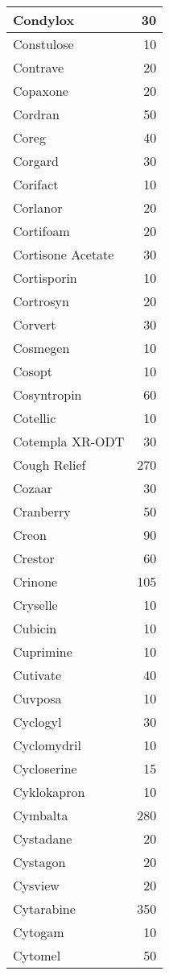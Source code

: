 \documentclass[
]{article}
\begin{document}
\begin{table}
\begin{tabular}[t]{l|r}
\hline
Condylox & 30\\
\hline
Constulose & 10\\
\hline
Contrave & 20\\
\hline
Copaxone & 20\\
\hline
Cordran & 50\\
\hline
Coreg & 40\\
\hline
Corgard & 30\\
\hline
Corifact & 10\\
\hline
Corlanor & 20\\
\hline
Cortifoam & 20\\
\hline
Cortisone Acetate & 30\\
\hline
Cortisporin & 10\\
\hline
Cortrosyn & 20\\
\hline
Corvert & 30\\
\hline
Cosmegen & 10\\
\hline
Cosopt & 10\\
\hline
Cosyntropin & 60\\
\hline
Cotellic & 10\\
\hline
Cotempla XR-ODT & 30\\
\hline
Cough Relief & 270\\
\hline
Cozaar & 30\\
\hline
Cranberry & 50\\
\hline
Creon & 90\\
\hline
Crestor & 60\\
\hline
Crinone & 105\\
\hline
Cryselle & 10\\
\hline
Cubicin & 10\\
\hline
Cuprimine & 10\\
\hline
Cutivate & 40\\
\hline
Cuvposa & 10\\
\hline
Cyclogyl & 30\\
\hline
Cyclomydril & 10\\
\hline
Cycloserine & 15\\
\hline
Cyklokapron & 10\\
\hline
Cymbalta & 280\\
\hline
Cystadane & 20\\
\hline
Cystagon & 20\\
\hline
Cysview & 20\\
\hline
Cytarabine & 350\\
\hline
Cytogam & 10\\
\hline
Cytomel & 50\\

\end{tabular}
\end{table}
\end{document}
